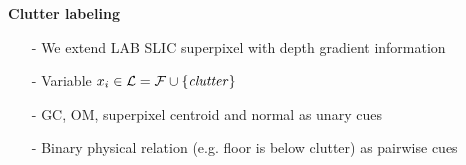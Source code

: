 \documentclass[a0paper,landscape,final]{baposter}
\newcommand{\compresslist}{%
\setlength{\itemsep}{1pt}%
\setlength{\parskip}{0pt}%
\setlength{\parsep}{0pt}%
}
\begin{document}
\begin{poster}
{\vspace{-0.1cm}
{\bf Clutter labeling}
\begin{itemize}[leftmargin=*] \compresslist
    \vspace{-0.1cm}
    \item[-] We extend LAB SLIC superpixel with depth gradient information
    \item[-] Variable $x_i\in \mathcal{L} = \mathcal{F} \cup \{\text{\emph{clutter}}\}$

    \item[-] GC, OM, superpixel centroid and normal as unary cues
    \item[-] Binary physical relation (e.g. floor is below clutter) as pairwise cues
\end{itemize}

}
\end{poster}
\end{document}
